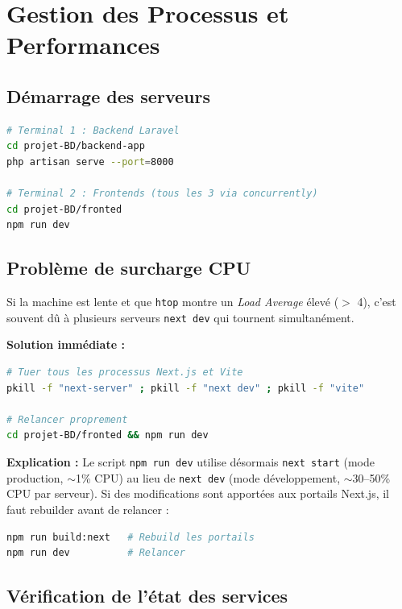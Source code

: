 \documentclass[12pt,a4paper]{report}
\begin{document}
\chapter{Gestion des Processus et Performances}

\section{Démarrage des serveurs}

\begin{lstlisting}[language=bash]
# Terminal 1 : Backend Laravel
cd projet-BD/backend-app
php artisan serve --port=8000

# Terminal 2 : Frontends (tous les 3 via concurrently)
cd projet-BD/fronted
npm run dev
\end{lstlisting}

\section{Problème de surcharge CPU}

\begin{warnbox}
Si la machine est lente et que \texttt{htop} montre un \textit{Load Average} élevé ($>$ 4), c'est souvent dû à plusieurs serveurs \texttt{next dev} qui tournent simultanément.
\end{warnbox}

\textbf{Solution immédiate :}
\begin{lstlisting}[language=bash]
# Tuer tous les processus Next.js et Vite
pkill -f "next-server" ; pkill -f "next dev" ; pkill -f "vite"

# Relancer proprement
cd projet-BD/fronted && npm run dev
\end{lstlisting}

\textbf{Explication :} Le script \texttt{npm run dev} utilise désormais \texttt{next start} (mode production, $\sim$1\% CPU) au lieu de \texttt{next dev} (mode développement, $\sim$30--50\% CPU par serveur). Si des modifications sont apportées aux portails Next.js, il faut rebuilder avant de relancer :

\begin{lstlisting}[language=bash]
npm run build:next   # Rebuild les portails
npm run dev          # Relancer
\end{lstlisting}

\section{Vérification de l'état des services}
\end{document}
